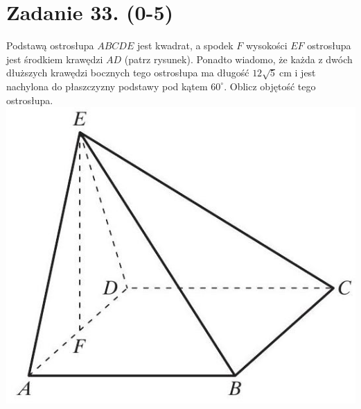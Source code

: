 \documentclass[10pt]{article}
\begin{document}
\section*{Zadanie 33. (0-5)}
Podstawą ostrosłupa \(A B C D E\) jest kwadrat, a spodek \(F\) wysokości \(E F\) ostrosłupa jest środkiem krawędzi \(A D\) (patrz rysunek). Ponadto wiadomo, że każda z dwóch dłuższych krawędzi bocznych tego ostrosłupa ma długość \(12 \sqrt{5} \mathrm{~cm}\) i jest nachylona do płaszczyzny podstawy pod kątem \(60^{\circ}\). Oblicz objętość tego ostrosłupa.\\
\includegraphics[max width=\textwidth, center]{2024_11_21_e15da647cf0a41077ac3g-13}
\end{document}
